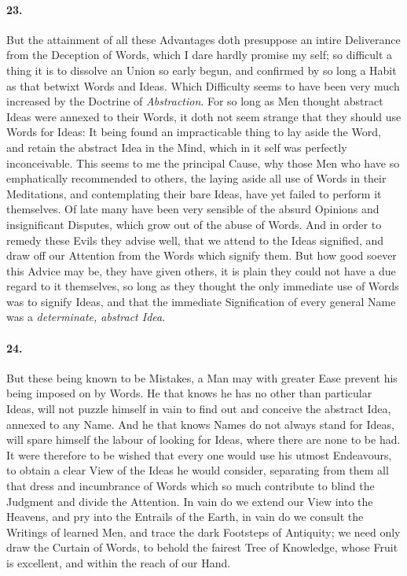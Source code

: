 \documentclass[]{article}
\newenvironment{sectionbody}{}{}
\begin{document}
\begin{sectionbody}
\paragraph{23.} But the attainment of all these Advantages doth presuppose an
intire Deliverance from the Deception of Words, which I dare
hardly promise my self; so difficult a thing it is to dissolve an
Union so early begun, and confirmed by so long a Habit as that
betwixt Words and Ideas.  Which Difficulty seems to have been
very much increased by the Doctrine of \emph{Abstraction}.  For
so long as Men thought abstract Ideas were annexed to their
Words, it doth not seem strange that they should use Words for
Ideas: It being found an impracticable thing to lay aside the
Word, and retain the abstract Idea in the Mind, which in it self
was perfectly inconceivable.  This seems to me the principal
Cause, why those Men who have so emphatically recommended to
others, the laying aside all use of Words in their Meditations,
and contemplating their bare Ideas, have yet failed to perform it
themselves.  Of late many have been very sensible of the absurd
Opinions and insignificant Disputes, which grow out of the abuse
of Words.  And in order to remedy these Evils they advise well,
that we attend to the Ideas signified, and draw off our Attention
from the Words which signify them.  But how good soever this
Advice may be, they have given others, it is plain they could not
have a due regard to it themselves, so long as they thought the
only immediate use of Words was to signify Ideas, and that the
immediate Signification of every general Name was a
\emph{determinate, abstract Idea}.



\paragraph{24.} But these being known to be Mistakes, a Man may with greater Ease
prevent his being imposed on by Words.  He that knows he has no
other than particular Ideas, will not puzzle himself in vain to
find out and conceive the abstract Idea, annexed to any Name.
And he that knows Names do not always stand for Ideas, will spare
himself the labour of looking for Ideas, where there are none to
be had.  It were therefore to be wished that every one would use
his utmost Endeavours, to obtain a clear View of the Ideas he
would consider, separating from them all that dress and
incumbrance of Words which so much contribute to blind the
Judgment and divide the Attention.  In vain do we extend our View
into the Heavens, and pry into the Entrails of the Earth, in vain
do we consult the Writings of learned Men, and trace the dark
Footsteps of Antiquity; we need only draw the Curtain of Words,
to behold the fairest Tree of Knowledge, whose Fruit is
excellent, and within the reach of our Hand.




\end{sectionbody}
\end{document}
